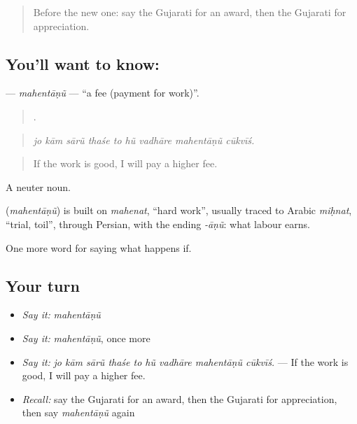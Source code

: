 \label{lesson:GU-C385-mahentanu}



\begin{quote}
Before the new one: say the Gujarati for an award, then the Gujarati for appreciation.
\end{quote}

\subsection*{You'll want to know: }
\textbf{} — \emph{mahentāṇũ} — \textquotedblleft{}a fee (payment for work)\textquotedblright{}.

\begin{quote}
        .
\end{quote}

\begin{quote}
\emph{jo kām sārũ thaśe to hũ vadhāre mahentāṇũ cūkvīś.}
\end{quote}

\begin{quote}
If the work is good, I will pay a higher fee.
\end{quote}

A neuter noun.

\begin{cousinweb}
\textbf{} (\emph{mahentāṇũ}) is built on \emph{mahenat}, \textquotedblleft{}hard work\textquotedblright{}, usually traced to Arabic \emph{miḥnat}, \textquotedblleft{}trial, toil\textquotedblright{}, through Persian, with the ending \emph{-āṇũ}: what labour earns.
\end{cousinweb}

\begin{grammarlens}[title={What you've built}]
One more word for saying what happens if.
\end{grammarlens}

\subsection*{Your turn}
\begin{itemize}
\raggedright
  \item \emph{Say it:} \emph{mahentāṇũ}
  \item \emph{Say it:} \emph{mahentāṇũ}, once more
  \item \emph{Say it:} \emph{jo kām sārũ thaśe to hũ vadhāre mahentāṇũ cūkvīś.} — If the work is good, I will pay a higher fee.
  \item \emph{Recall:} say the Gujarati for an award, then the Gujarati for appreciation, then say \emph{mahentāṇũ} again
\end{itemize}


